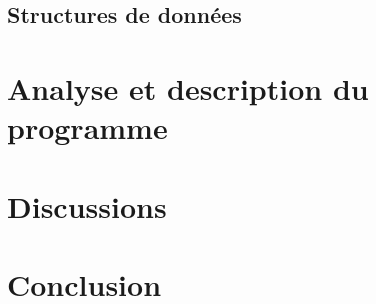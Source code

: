 \documentclass[12pt,french]{article}
\begin{document}

        \subsection{Structures de données} %
        \label{sub:struct-donnes}


    \section{Analyse et description du programme} %
    \label{sec:analyse-desc}


    \section{Discussions} %
    \label{sec:discussions}


    \section{Conclusion} %
    \label{sec:Conclusion}


\end{document}
